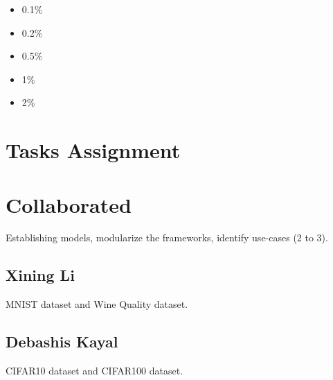 \documentclass{article}
\begin{document}
\begin{itemize}
    \item 0.1\%
    \item 0.2\%
    \item 0.5\%
    \item 1\%
    \item 2\%
\end{itemize}


\section{Tasks Assignment}

\section{Collaborated}
Establishing models, modularize the frameworks, identify use-cases (2 to 3).

\subsection{Xining Li}
MNIST dataset and Wine Quality dataset. 

\subsection{Debashis Kayal}
CIFAR10 dataset and CIFAR100 dataset. 
\end{document}
